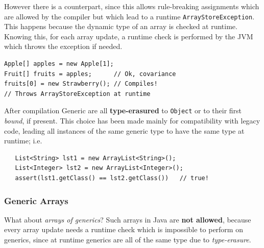 However there is a counterpart, since this allows rule-breaking assignments
which are allowed by the compiler but which lead to a runtime \lstinline|ArrayStoreException|.
This happens because the dynamic type of an array is checked at runtime.
Knowing this, for each array update, a runtime check is performed by the JVM which throws the exception if needed.
\begin{lstlisting}
Apple[] apples = new Apple[1];
Fruit[] fruits = apples;      // Ok, covariance
fruits[0] = new Strawberry(); // Compiles!
// Throws ArrayStoreException at runtime
\end{lstlisting}

After compilation Generic are all \textbf{type-erasured} to \lstinline|Object| or to their first \textit{bound}, if present.
This choice has been made mainly for compatibility with legacy code, leading all instances of the same generic type to have the same type at runtime; 
i.e.
\begin{lstlisting}
   List<String> lst1 = new ArrayList<String>();
   List<Integer> lst2 = new ArrayList<Integer>();
   assert(lst1.getClass() == lst2.getClass())   // true!
\end{lstlisting}

\subsubsection{Generic Arrays}
What about \textit{arrays of generics}?
Such arrays in Java are \textbf{not allowed},
because every array update needs a runtime check which is impossible to perform on generics,
since at runtime generics are all of the same type due to \textit{type-erasure}.


